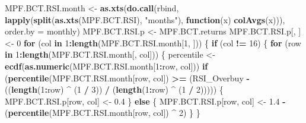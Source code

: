 \documentclass[]{article}
\newenvironment{Shaded}{\begin{snugshade}}{\end{snugshade}}
\newcommand{\ControlFlowTok}[1]{\textcolor[rgb]{0.13,0.29,0.53}{\textbf{#1}}}
\newcommand{\DataTypeTok}[1]{\textcolor[rgb]{0.13,0.29,0.53}{#1}}
\newcommand{\DecValTok}[1]{\textcolor[rgb]{0.00,0.00,0.81}{#1}}
\newcommand{\FloatTok}[1]{\textcolor[rgb]{0.00,0.00,0.81}{#1}}
\newcommand{\KeywordTok}[1]{\textcolor[rgb]{0.13,0.29,0.53}{\textbf{#1}}}
\newcommand{\NormalTok}[1]{#1}
\newcommand{\OperatorTok}[1]{\textcolor[rgb]{0.81,0.36,0.00}{\textbf{#1}}}
\newcommand{\StringTok}[1]{\textcolor[rgb]{0.31,0.60,0.02}{#1}}
\begin{document}
\begin{Shaded}
\begin{Highlighting}[]
\NormalTok{MPF.BCT.RSI.month <-}
\StringTok{  }\KeywordTok{as.xts}\NormalTok{(}\KeywordTok{do.call}\NormalTok{(rbind, }\KeywordTok{lapply}\NormalTok{(}\KeywordTok{split}\NormalTok{(}\KeywordTok{as.xts}\NormalTok{(MPF.BCT.RSI), }\StringTok{"months"}\NormalTok{), }\ControlFlowTok{function}\NormalTok{(x)}
    \KeywordTok{colAvgs}\NormalTok{(x))), }\DataTypeTok{order.by =}\NormalTok{ monthly)}
\NormalTok{MPF.BCT.RSI.p <-}\StringTok{ }\NormalTok{MPF.BCT.returns}
\NormalTok{MPF.BCT.RSI.p[, ] <-}\StringTok{ }\DecValTok{0}
\ControlFlowTok{for}\NormalTok{ (col }\ControlFlowTok{in} \DecValTok{1}\OperatorTok{:}\KeywordTok{length}\NormalTok{(MPF.BCT.RSI.month[}\DecValTok{1}\NormalTok{, ])) \{}
  \ControlFlowTok{if}\NormalTok{ (col }\OperatorTok{!=}\StringTok{ }\DecValTok{16}\NormalTok{) \{}
    \ControlFlowTok{for}\NormalTok{ (row }\ControlFlowTok{in} \DecValTok{1}\OperatorTok{:}\KeywordTok{length}\NormalTok{(MPF.BCT.RSI.month[, col])) \{}
\NormalTok{      percentile <-}\StringTok{ }\KeywordTok{ecdf}\NormalTok{(}\KeywordTok{as.numeric}\NormalTok{(MPF.BCT.RSI.month[}\DecValTok{1}\OperatorTok{:}\NormalTok{row, col]))}
      \ControlFlowTok{if}\NormalTok{ (}\KeywordTok{percentile}\NormalTok{(MPF.BCT.RSI.month[row, col]) }\OperatorTok{>=}\StringTok{ }\NormalTok{(RSI_Overbuy }\OperatorTok{-}\StringTok{ }\NormalTok{((}\KeywordTok{length}\NormalTok{(}\DecValTok{1}\OperatorTok{:}\NormalTok{row) }\OperatorTok{^}
\StringTok{                                                                      }\NormalTok{(}\DecValTok{1} \OperatorTok{/}\StringTok{ }\DecValTok{3}\NormalTok{)) }\OperatorTok{/}\StringTok{ }\NormalTok{(}\KeywordTok{length}\NormalTok{(}\DecValTok{1}\OperatorTok{:}\NormalTok{row) }\OperatorTok{^}\StringTok{ }\NormalTok{(}\DecValTok{1} \OperatorTok{/}\StringTok{ }\DecValTok{2}\NormalTok{))))) \{}
\NormalTok{        MPF.BCT.RSI.p[row, col] <-}\StringTok{ }\FloatTok{0.4}
\NormalTok{      \} }\ControlFlowTok{else}\NormalTok{ \{}
\NormalTok{        MPF.BCT.RSI.p[row, col] <-}
\StringTok{          }\FloatTok{1.4} \OperatorTok{-}\StringTok{ }\NormalTok{(}\KeywordTok{percentile}\NormalTok{(MPF.BCT.RSI.month[row, col]) }\OperatorTok{^}\StringTok{ }\DecValTok{2}\NormalTok{)}
\NormalTok{      \}}
\NormalTok{    \}}
    

\end{Highlighting}
\end{Shaded}
\end{document}
